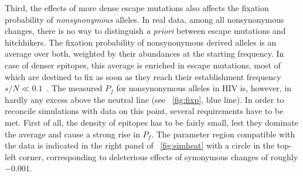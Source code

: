 \documentclass[12pt,a4paper,notitlepage,onecolumn]{article}
\begin{document}
Third, the effects of more dense escape mutations also affects the fixation
probability of {\it nonsynonymous} alleles. In real data, among all
nonsynonymous changes, there is no way to distinguish {\it a priori} between
escape mutations and hitchhikers. The fixation probability of nonsynonymous
derived alleles is an average over both, weighted by their abundances at the
starting frequency. In case of denser epitopes, this average is enriched in
escape mutations, most of which are destined to fix as soon as they reach their
establishment frequency $s/N \ll 0.1$~\citep{desai_beneficial_2007}. The
measured $P_f$ for nonsynonymous alleles in HIV is, however, in hardly any
excess above the neutral line (see \figurename~\ref{fig:fixp}, blue line). In
order to reconcile simulations with data on this point, several requirements
have to be met. First of all, the density of epitopes has to be fairly small,
lest they dominate the average and cause a strong rise in $P_f$. The parameter
region compatible with the data is indicated in the right panel of
\figurename~\ref{fig:simheat} with a circle in the top-left corner,
corresponding to deleterious effects of synonymous changes of roughly $-0.001$.
\end{document}
